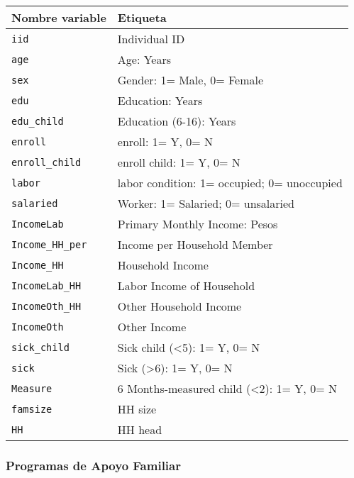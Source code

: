 \documentclass[
]{article}
\begin{document}
\begin{longtable}[]{@{}ll@{}}
\toprule\noalign{}
\textbf{Nombre variable} & \textbf{Etiqueta} \\
\midrule\noalign{}
\endhead
\bottomrule\noalign{}
\endlastfoot
\texttt{iid} & Individual ID \\
\texttt{age} & Age: Years \\
\texttt{sex} & Gender: 1= Male, 0= Female \\
\texttt{edu} & Education: Years \\
\texttt{edu\_child} & Education (6-16): Years \\
\texttt{enroll} & enroll: 1= Y, 0= N \\
\texttt{enroll\_child} & enroll child: 1= Y, 0= N \\
\texttt{labor} & labor condition: 1= occupied; 0= unoccupied \\
\texttt{salaried} & Worker: 1= Salaried; 0= unsalaried \\
\texttt{IncomeLab} & Primary Monthly Income: Pesos \\
\texttt{Income\_HH\_per} & Income per Household Member \\
\texttt{Income\_HH} & Household Income \\
\texttt{IncomeLab\_HH} & Labor Income of Household \\
\texttt{IncomeOth\_HH} & Other Household Income \\
\texttt{IncomeOth} & Other Income \\
\texttt{sick\_child} & Sick child (\textless5): 1= Y, 0= N \\
\texttt{sick} & Sick (\textgreater6): 1= Y, 0= N \\
\texttt{Measure} & 6 Months-measured child (\textless2): 1= Y, 0= N \\
\texttt{famsize} & HH size \\
\texttt{HH} & HH head \\
\end{longtable}

\subsubsection{Programas de Apoyo
Familiar}\label{programas-de-apoyo-familiar}
\end{document}
